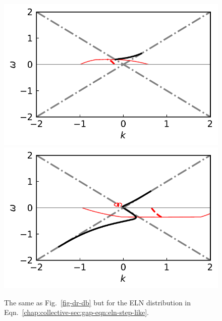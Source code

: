 \begin{figure}
   \includegraphics[width=\linewidth]{chapters/assets/dr/spectBoxC1MAADRPltBlob.pdf}
   \endminipage\hfill
   \includegraphics[width=\linewidth]{chapters/assets/dr/spectBoxC1MZADRPltBlob.pdf}
   \endminipage\hfill
   \caption{The same as Fig.~\ref{fig-dr-db} but for the ELN distribution in Eqn.~\eqref{chap:collective-sec:gap-eqn:eln-step-like}.
    }
   \label{fig-box-c1}
\end{figure}



